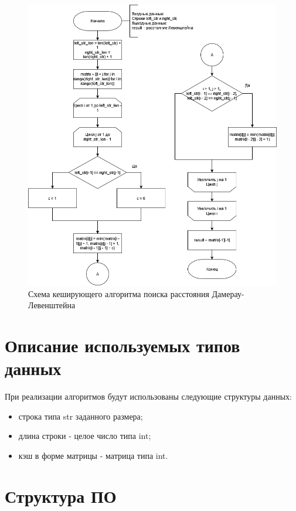 \newpage 
\begin{figure}[H]
	\begin{center}
		\includegraphics[scale=0.6]{assets/cacheDamerayLevenshtain.png}
	\end{center}
	\caption{Схема кеширующего алгоритма поиска расстояния Дамерау-Левенштейна}
\end{figure}

\newpage
\section{Описание используемых типов данных}

При реализации алгоритмов будут использованы следующие структуры данных:
\begin{itemize}
	\item строка типа str заданного размера;
	\item длина строки - целое число типа int;
	\item кэш в форме матрицы - матрица типа int.
\end{itemize}

\section{Структура ПО}

